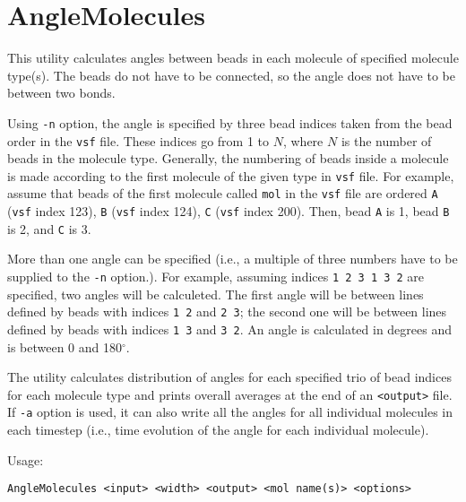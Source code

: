 \section{AngleMolecules} \label{sec:AngleMolecules}

This utility calculates angles between beads in each molecule of specified
molecule type(s). The beads do not have to be connected, so the angle does
not have to be between two bonds.

Using \texttt{-n} option, the angle is specified by three bead indices taken
from the bead order in the \texttt{vsf} file. These indices go from 1
to $N$, where $N$ is the number of beads in the molecule type. Generally,
the numbering of beads inside a molecule is made according to the first
molecule of the given type in \texttt{vsf} file. For example, assume that
beads of the first molecule called \texttt{mol} in the \texttt{vsf} file
are ordered \texttt{A} (\texttt{vsf} index 123), \texttt{B} (\texttt{vsf}
index 124), \texttt{C} (\texttt{vsf} index 200). Then, bead \texttt{A} is
1, bead \texttt{B} is 2, and \texttt{C} is 3.

More than one angle can be specified (i.e., a multiple of three numbers
have to be supplied to the \texttt{-n} option.). For example, assuming
indices \texttt{1 2 3 1 3 2} are specified, two angles will be calculeted.
The first angle will be between lines defined by beads with indices
\texttt{1 2} and \texttt{2 3}; the second one will be between lines defined
by beads with indices \texttt{1 3} and \texttt{3 2}. An angle is calculated in
degrees and is between 0 and 180$^{\circ}$.

The utility calculates distribution of angles for each specified trio of
bead indices for each molecule type and prints overall averages at the end
of an \texttt{<output>} file. If \texttt{-a} option is used, it can also write
all the angles for all individual molecules in each timestep (i.e., time
evolution of the angle for each individual molecule).

Usage:

\vspace{1em}
\noindent
\texttt{AngleMolecules <input> <width> <output> <mol name(s)> <options>}

